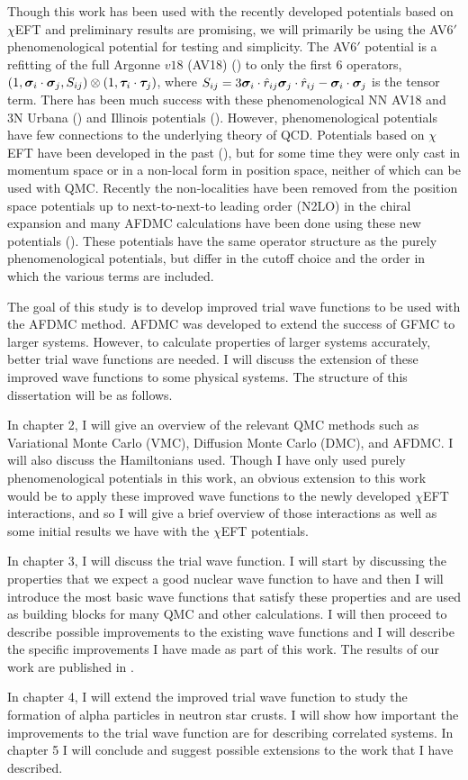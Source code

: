 Though this work has been used with the recently developed potentials based on $\chi$EFT and preliminary results are promising, we will primarily be using the AV6$'$ phenomenological potential for testing and simplicity. The AV6$'$ potential is a refitting of the full Argonne $v18$ (AV18) (\cite{wiringa1995}) to only the first 6 operators, $(1,\bm{\sigma}_i\cdot\bm{\sigma}_j,S_{ij})\otimes(1,\bm{\tau}_i\cdot\bm{\tau}_j)$, where $S_{ij} = 3\bm{\sigma}_i\cdot\hat{r}_{ij}\bm{\sigma}_j\cdot\hat{r}_{ij}-\bm{\sigma}_i\cdot\bm{\sigma}_j$ is the tensor term. There has been much success with these phenomenological NN AV18 and 3N Urbana (\cite{carlson1983}) and Illinois potentials (\cite{pieper2001}). However, phenomenological potentials have few connections to the underlying theory of QCD. Potentials based on $\chi$EFT have been developed in the past (\cite{epelbaum2009}), but for some time they were only cast in momentum space or in a non-local form in position space, neither of which can be used with QMC. Recently the non-localities have been removed from the position space potentials up to next-to-next-to leading order (N2LO) in the chiral expansion and many AFDMC calculations have been done using these new potentials (\cite{gezerlis2013}). These potentials have the same operator structure as the purely phenomenological potentials, but differ in the cutoff choice and the order in which the various terms are included.

The goal of this study is to develop improved trial wave functions to be used with the AFDMC method. AFDMC was developed to extend the success of GFMC to larger systems. However, to calculate properties of larger systems accurately, better trial wave functions are needed. I will discuss the extension of these improved wave functions to some physical systems. The structure of this dissertation will be as follows.

In chapter 2, I will give an overview of the relevant QMC methods such as Variational Monte Carlo (VMC), Diffusion Monte Carlo (DMC), and AFDMC. I will also discuss the Hamiltonians used. Though I have only used purely phenomenological potentials in this work, an obvious extension to this work would be to apply these improved wave functions to the newly developed $\chi$EFT interactions, and so I will give a brief overview of those interactions as well as some initial results we have with the $\chi$EFT potentials.

In chapter 3, I will discuss the trial wave function. I will start by discussing the properties that we expect a good nuclear wave function to have and then I will introduce the most basic wave functions that satisfy these properties and are used as building blocks for many QMC and other calculations. I will then proceed to describe possible improvements to the existing wave functions and I will describe the specific improvements I have made as part of this work. The results of our work are published in \cite{lonardoni2018}.

In chapter 4, I will extend the improved trial wave function to study the formation of alpha particles in neutron star crusts. I will show how important the improvements to the trial wave function are for describing correlated systems. In chapter 5 I will conclude and suggest possible extensions to the work that I have described.
